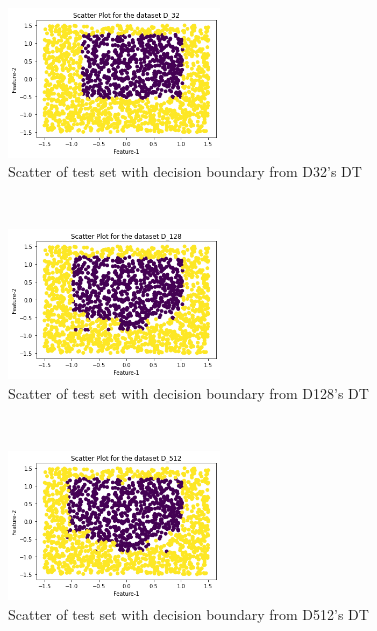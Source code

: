 \documentclass[a4paper]{article}
\theoremstyle{definition}
\newenvironment{soln}{
    \leavevmode\color{blue}\ignorespaces
}{}
\begin{document}
\begin{enumerate}
\begin{soln}
    \begin{figure}[h!]
        \centering
        \includegraphics[width=0.5\textwidth]{images/q2_7_3a.png}
        \caption{Scatter of test set with decision boundary from D32's DT}
        \label{fig:q2_7_3a}
    \end{figure} \\
    \begin{figure}[h!]
        \centering
        \includegraphics[width=0.5\textwidth]{images/q2_7_3b.png}
        \caption{Scatter of test set with decision boundary from D128's DT}
        \label{fig:q2_7_3b}
    \end{figure} \\
    \begin{figure}[h!]
        \centering
        \includegraphics[width=0.5\textwidth]{images/q2_7_3c.png}
        \caption{Scatter of test set with decision boundary from D512's DT}
        \label{fig:q2_7_3c}
        
    \end{figure} \\


\end{soln}
\end{enumerate}
\end{document}

